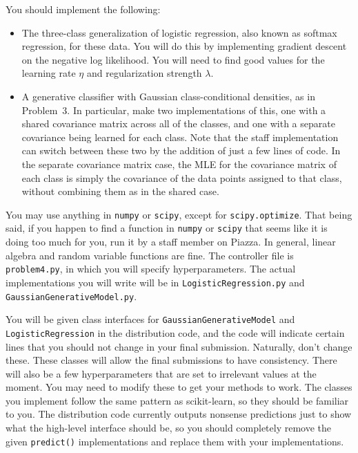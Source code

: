 \documentclass[submit]{harvardml}
\begin{document}
\begin{problem}
You should implement the following:
\begin{itemize}
\item The three-class generalization of logistic regression, also
  known as softmax regression, for these data. You will do this by implementing
  gradient descent on the negative log likelihood. You will need to find good values for the learning rate $\eta$ and regularization strength $\lambda$.
%
\item A generative classifier with Gaussian
  class-conditional densities, as in Problem~3. In particular, make
  two implementations of this, one with a shared covariance matrix
  across all of the classes, and one with a separate covariance being
  learned for each class.  Note that the staff implementation can
  switch between these two by the addition of just a few lines of
  code. In the separate covariance matrix case, the MLE for the
  covariance matrix of each class is simply the covariance of the data
  points assigned to that class, without combining them as in the
  shared case.
\end{itemize}
You may use anything in  \texttt{numpy} or \texttt{scipy}, except for \texttt{scipy.optimize}. That being said, if you happen to find a function in \texttt{numpy} or \texttt{scipy} that seems like it is doing too much for you, run it by a staff member on Piazza. In general, linear algebra and random variable functions are fine. The controller file is \texttt{problem4.py}, in which you will specify hyperparameters. The actual implementations you will write will be in \texttt{LogisticRegression.py} and \texttt{GaussianGenerativeModel.py}.


You will be given class interfaces for \texttt{GaussianGenerativeModel} and \texttt{LogisticRegression} in the distribution code,
and the code will indicate certain lines that you should not change in your final submission. Naturally, don't change these.
These classes will allow the final submissions to have consistency. There will also be a few hyperparameters that are set to
irrelevant values at the moment. You may need to modify these to get your methods to work.
The classes you implement follow the same pattern as scikit-learn, so they should be familiar to you. The distribution code currently outputs nonsense predictions just to show what the high-level interface should be, so you should completely remove the given \texttt{predict()} implementations and replace them with your implementations.


\end{problem}
\end{document}
